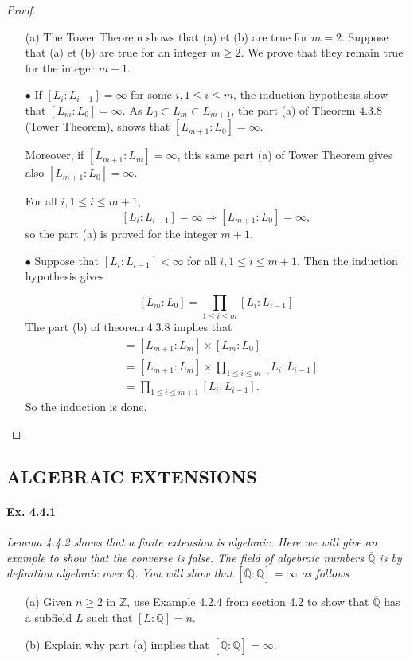 \documentclass[11pt,a4paper]{article}
\newcommand{\Q}{\mathbb{Q}}
\newcommand{\Z}{\mathbb{Z}}
\begin{document}
\begin{proof}
\begin{enumerate}
\item[(a)]
The Tower Theorem shows that (a) et (b) are true for $m=2$. Suppose that (a) et (b) are true for an integer $m\geq 2$. We prove that they remain true for the integer $m+1$.

$\bullet$  If  $[L_i : L_{i-1}] = \infty$ for some $i, 1 \leq i \leq m$, the induction hypothesis show that $[L_m : L_0] = \infty$. As  $L_0 \subset L_m \subset L_{m+1}$, the part (a) of Theorem 4.3.8 (Tower Theorem), shows that $[L_{m+1} : L_0] = \infty$.

Moreover, if $[L_{m+1} : L_{m}] = \infty$, this same part (a) of Tower Theorem gives also $[L_{m+1} : L_0] = \infty$.

For all $i, 1 \leq i \leq m+1$,  $$[L_i : L_{i-1}] = \infty \Rightarrow [L_{m+1} : L_0] = \infty,$$  so the part (a) is proved for the integer $m+1$.

$\bullet$ Suppose that $[L_i : L_{i-1}] < \infty$ for all $i, 1\leq i \leq m+1$.
Then the induction hypothesis gives 

$$[L_m : L_0] = \prod_{1\leq i \leq m} [L_i : L_{i-1}]$$
The part (b) of theorem 4.3.8 implies that
\begin{align*}
 [L_{m+1}:L_0] &=  [L_{m+1}:L_{m}] \times  [L_{m}:L_0] \\
 &=  [L_{m+1}:L_{m}] \times \prod_{1\leq i \leq m} [L_i : L_{i-1}] \\
 &=  \prod_{1\leq i \leq m+1} [L_i : L_{i-1}].
 \end{align*}
So the induction is done.
\end{enumerate}
\end{proof}

\subsection{ALGEBRAIC EXTENSIONS}

\paragraph{Ex. 4.4.1}

{\it Lemma 4.4.2 shows that a finite extension is algebraic. Here we will give an example to show that the converse is false. The field of algebraic numbers $\overline{\Q}$ is by definition algebraic over $\Q$. You will show that $[\overline{\Q} : \Q] = \infty$ as follows
\begin{enumerate}
\item[(a)] Given $n\geq 2$ in $\Z$, use Example 4.2.4 from section 4.2 to show that $\overline{\Q}$ has a subfield $L$ such that $[L:\Q] = n$.
\item[(b)] Explain why part (a) implies that $[\overline{\Q} : \Q] = \infty$.
\end{enumerate}
}
\end{document}

